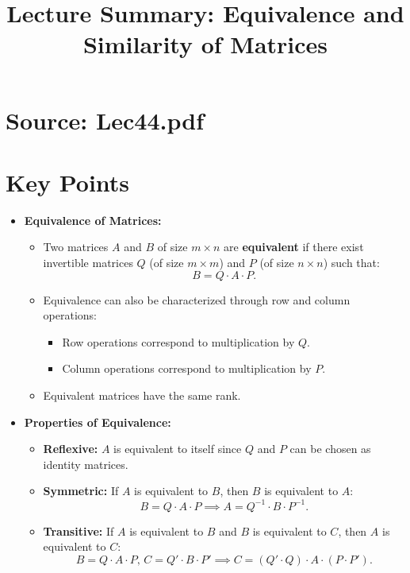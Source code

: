 \documentclass{article}
\title{Lecture Summary: Equivalence and Similarity of Matrices}
\author{}
\date{}
\begin{document}
\maketitle

\section*{Source: Lec44.pdf}

\section*{Key Points}

\begin{itemize}
  \item \textbf{Equivalence of Matrices:}
    \begin{itemize}
      \item Two matrices $A$ and $B$ of size $m \times n$ are \textbf{equivalent} if there exist invertible matrices $Q$ (of size $m \times m$) and $P$ (of size $n \times n$) such that:
        \[
          B = Q \cdot A \cdot P.
        \]
      \item Equivalence can also be characterized through row and column operations:
        \begin{itemize}
          \item Row operations correspond to multiplication by $Q$.
          \item Column operations correspond to multiplication by $P$.
        \end{itemize}
      \item Equivalent matrices have the same rank.
    \end{itemize}

  \item \textbf{Properties of Equivalence:}
    \begin{itemize}
      \item \textbf{Reflexive:} $A$ is equivalent to itself since $Q$ and $P$ can be chosen as identity matrices.
      \item \textbf{Symmetric:} If $A$ is equivalent to $B$, then $B$ is equivalent to $A$:
        \[
          B = Q \cdot A \cdot P \implies A = Q^{-1} \cdot B \cdot P^{-1}.
        \]
      \item \textbf{Transitive:} If $A$ is equivalent to $B$ and $B$ is equivalent to $C$, then $A$ is equivalent to $C$:
        \[
          B = Q \cdot A \cdot P, \, C = Q' \cdot B \cdot P' \implies C = (Q' \cdot Q) \cdot A \cdot (P \cdot P').
        \]
    \end{itemize}


\end{itemize}
\end{document}
